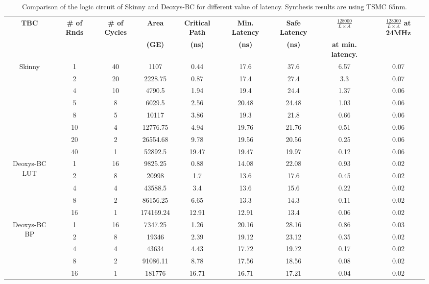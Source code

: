 \documentclass[conference]{IEEEtran}
\begin{document}
\begin{table}[!thb]
\centering
\caption{Comparison of the logic circuit of Skinny and Deoxys-BC for different value of latency. Synthesis results are using TSMC 65nm.}\label{tab:comptbc}
\begin{tabular}{c|c|c|c|c|c|c|c|c}\hline
  \multirow{2}{*}{\textbf{TBC}} & \multirow{2}{*}{\textbf{\# of Rnds}} & \multirow{2}{*}{\textbf{\# of Cycles}} & \textbf{Area} & \textbf{Critical Path} & \textbf{Min. Latency} & \textbf{Safe Latency} & \textbf{$\frac{128000}{L\times A}$}  & \multirow{2}{*}{\textbf{$\frac{128000}{L\times A}$ at 24MHz}} \\
  & & & \textbf{(GE)} & \textbf{(ns)} & \textbf{(ns)} & \textbf{(ns)} & \textbf{at min. latency.} & \\ \hline \hline
  \multirow{8}{*}{Skinny} &
    1	& 40 & 1107 & 0.44	& 17.6	& 37.6 & 6.57 & 0.07 \\
  & 2	& 20 & 2228.75 & 0.87	& 17.4	& 27.4 & 3.3 & 0.07 \\
  & 4	& 10 & 4790.5 & 1.94	& 19.4	& 24.4 & 1.37 & 0.06 \\ 
  & 5	&  8 & 6029.5 & 2.56	& 20.48	& 24.48 & 1.03 & 0.06 \\
  & 8	&  5 & 10117 & 3.86	& 19.3	& 21.8 & 0.66 & 0.06 \\
  & 10 & 4 & 12776.75 & 4.94	& 19.76	& 21.76 & 0.51 & 0.06 \\
  & 20 & 2 & 26554.68 & 9.78	& 19.56	& 20.56 & 0.25 & 0.06 \\
  & 40 & 1 & 52892.5 & 19.47 & 19.47 & 19.97 & 0.12 & 0.06 \\
    \hline
    \multirow{5}{*}{Deoxys-BC LUT} &
    1 & 16 & 9825.25& 0.88 & 14.08 & 22.08 & 0.93 & 0.02 \\
    & 2 & 8 & 20998& 1.7 & 13.6 & 17.6 & 0.45 & 0.02 \\
    & 4 & 4 & 43588.5& 3.4 & 13.6 & 15.6 & 0.22 & 0.02 \\
    & 8 & 2 & 86156.25& 6.65 & 13.3 & 14.3 & 0.11 & 0.02 \\
    & 16 & 1 & 174169.24& 12.91 & 12.91 & 13.4 & 0.06 & 0.02 \\
    \hline
    \multirow{5}{*}{Deoxys-BC BP} &
    1 & 16 & 7347.25& 1.26 & 20.16 & 28.16 & 0.86 & 0.03 \\
    & 2 & 8 & 19346 & 2.39 & 19.12 & 23.12 & 0.35 & 0.02 \\
    & 4 & 4 & 43634 & 4.43 & 17.72 & 19.72 & 0.17 & 0.02 \\
    & 8 & 2 & 91086.11& 8.78 & 17.56 & 18.56 & 0.08 & 0.02 \\
    & 16 & 1 & 181776 &  16.71 &  16.71 &  17.21 &  0.04 & 0.02 \\ \hline
\end{tabular}
\end{table}
\end{document}
